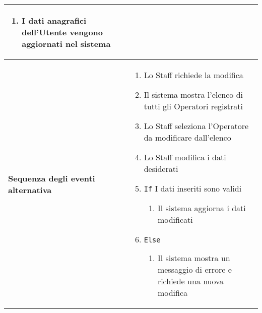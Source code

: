 \documentclass[a4paper]{report}
\begin{document}
\begin{table}[H]
\begin{tabular}{|p{3.9cm}|p{9.9cm}|}
\begin{enumerate}[leftmargin=14pt,label=\arabic*.,labelsep=0.5em,topsep=0pt,partopsep=0pt,parsep=0pt,itemsep=0pt]
    \item I dati anagrafici dell’Utente vengono aggiornati nel sistema
    \end{enumerate} \\ \hline
\textbf{Sequenza degli eventi alternativa} & \begin{enumerate}[leftmargin=14pt,label=\arabic*.,labelsep=0.5em,topsep=0pt,partopsep=0pt,parsep=0pt,itemsep=0pt] 
    \item Lo Staff richiede la modifica
    \item Il sistema mostra l’elenco di tutti gli Operatori registrati
    \item Lo Staff seleziona l’Operatore da modificare dall’elenco
    \item Lo Staff modifica i dati desiderati
    \item \texttt{If} I dati inseriti sono validi
    \begin{enumerate}[label=\arabic{enumi}.\arabic*.,leftmargin=22pt,labelsep=0.5em,topsep=0pt,partopsep=0pt,parsep=0pt,itemsep=0pt]
        \item Il sistema aggiorna i dati modificati
    \end{enumerate}
    \item \texttt{Else}
    \begin{enumerate}[label=\arabic{enumi}.\arabic*.,leftmargin=22pt,labelsep=0.5em,topsep=0pt,partopsep=0pt,parsep=0pt,itemsep=0pt]
        \item Il sistema mostra un messaggio di errore e richiede una nuova modifica
    \end{enumerate}
\end{enumerate}\\ \hline
\end{tabular}
\end{table}
\end{document}
